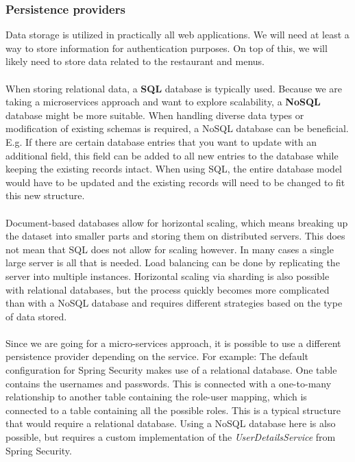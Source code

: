 \documentclass[12pt]{article}
\begin{document}
\begin{multicols}{2}
\subsubsection{Persistence providers}
Data storage is utilized in practically all web applications. We will need at least a way to store information for authentication purposes. On top of this, we will likely need to store data related to the restaurant and menus. 
\\\\
When storing relational data, a \textbf{SQL} database is typically used. Because we are taking a microservices approach and want to explore scalability, a \textbf{NoSQL} database might be more suitable.\cite{MongodbVsMySQL92:online} When handling diverse data types or modification of existing schemas is required, a NoSQL database can be beneficial. E.g. If there are certain database entries that you want to update with an additional field, this field can be added to all new entries to the database while keeping the existing records intact. When using SQL, the entire database model would have to be updated and the existing records will need to be changed to fit this new structure. 
\\\\
Document-based databases allow for horizontal scaling, which means breaking up the dataset into smaller parts and storing them on distributed servers. This does not mean that SQL does not allow for scaling however. In many cases a single large server is all that is needed. Load balancing can be done by replicating the server into multiple instances. Horizontal scaling via sharding is also possible with relational databases, but the process quickly becomes more complicated than with a NoSQL database and requires different strategies based on the type of data stored. \cite{sharding93:online}
\\\\
Since we are going for a micro-services approach, it is possible to use a different persistence provider depending on the service. For example: The default configuration for Spring Security makes use of a relational database. One table contains the usernames and passwords. This is connected with a one-to-many relationship to another table containing the role-user mapping, which is connected to a table containing all the possible roles. This is a typical structure that would require a relational database. Using a NoSQL database here is also possible, but requires a custom implementation of the \textit{UserDetailsService} from Spring Security. 

\end{multicols}
\end{document}
